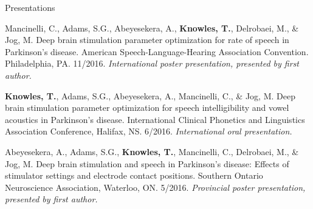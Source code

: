 \documentclass{resume} %
\begin{document}
\begin{rSection}{Presentations}
\begin{etaremune}
%	
%	
	
\item Mancinelli, C., Adams, S.G., Abeyesekera, A., {\bf Knowles, T.}, Delrobaei, M., \& Jog, M. Deep brain stimulation parameter optimization for rate of speech in Parkinson's disease. American Speech-Language-Hearing Association Convention. Philadelphia, PA. 11/2016. \emph{International poster presentation, presented by first author.}
	
\item {\bf Knowles, T.}, Adams, S.G., Abeyesekera, A., Mancinelli, C., \& Jog, M. Deep brain stimulation parameter optimization for speech intelligibility and vowel acoustics in Parkinson's disease. International Clinical Phonetics and Linguistics Association Conference, Halifax, NS. 6/2016. \emph{International oral presentation.}
	
\item Abeyesekera, A., Adams, S.G., {\bf Knowles, T.}, Mancinelli, C., Delrobaei, M., \& Jog, M. Deep brain stimulation and speech in Parkinson's disease: Effects of stimulator settings and electrode contact positions. Southern Ontario Neuroscience Association, Waterloo, ON. 5/2016. \emph{Provincial poster presentation, presented by first author.}
	
	

\end{etaremune}
\end{rSection}
\end{document}
